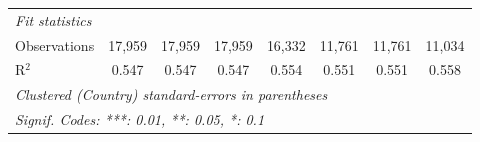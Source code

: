 \begin{tabular}{lccccccc}
   \midrule \emph{Fit statistics}\\
   Observations                                                                                        & 17,959  & 17,959       & 17,959  & 16,332        & 11,761  & 11,761  & 11,034\\  
   R$^2$                                                                                               & 0.547   & 0.547        & 0.547   & 0.554         & 0.551   & 0.551   & 0.558\\  
   \midrule
   \multicolumn{8}{l}{\emph{Clustered (Country) standard-errors in parentheses}}\\
   \multicolumn{8}{l}{\emph{Signif. Codes: ***: 0.01, **: 0.05, *: 0.1}}\\
\end{tabular}
\par\endgroup


